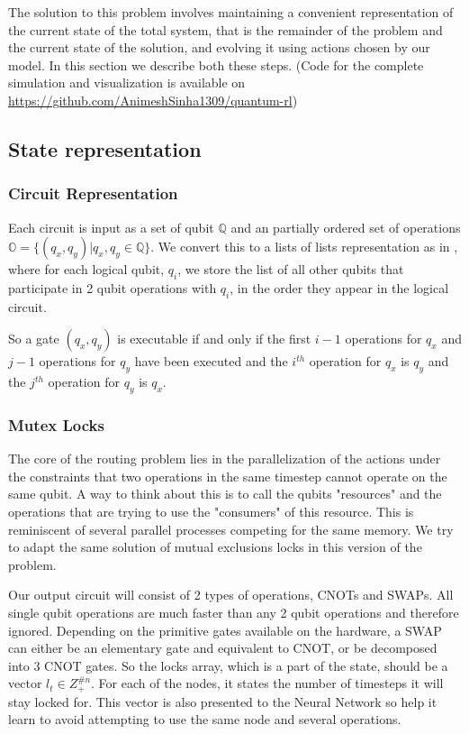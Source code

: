 \documentclass[%
 reprint,
 amsmath,amssymb,
 aps,
]{revtex4-2}
\begin{document}
The solution to this problem involves maintaining a convenient representation of the current state of the total system, that is the remainder of the problem and the current state of the solution, and evolving it using actions chosen by our model. In this section we describe both these steps. (Code for the complete simulation and visualization is available on \url{https://github.com/AnimeshSinha1309/quantum-rl})

\subsection{\label{sec:method-state}State representation}

\subsubsection{\label{sec:method-state-circuit}Circuit Representation}

Each circuit is input as a set of qubit $\mathbb{Q}$ and an partially ordered set of operations $\mathbb{O} = \{(q_x, q_y) \vert q_x, q_y \in \mathbb{Q}\}$.
We convert this to a lists of lists representation as in \citet{qroute_dqn2}, where for each logical qubit, $q_i$, we store the list of all other qubits that participate in 2 qubit operations with $q_i$, in the order they appear in the logical circuit.

\label{para:method-state-circuit-gatecond}So a gate $(q_x, q_y)$ is executable if and only if the first $i - 1$ operations for $q_x$ and $j - 1$ operations for $q_y$ have been executed and the $i^{th}$ operation for $q_x$ is $q_y$ and the $j^{th}$ operation for $q_y$ is $q_x$.

\subsubsection{\label{sec:method-state-mutex}Mutex Locks}

The core of the routing problem lies in the parallelization of the actions under the constraints that two operations in the same timestep cannot operate on the same qubit. A way to think about this is to call the qubits "resources" and the operations that are trying to use the "consumers" of this resource. This is reminiscent of several parallel processes competing for the same memory. We try to adapt the same solution of mutual exclusions locks \citep{mutex_dijkstra} in this version of the problem.

Our output circuit will consist of 2 types of operations, CNOTs and SWAPs. All single qubit operations are much faster than any 2 qubit operations and therefore ignored. Depending on the primitive gates available on the hardware, a SWAP can either be an elementary gate and equivalent to CNOT, or be decomposed into 3 CNOT gates. So the locks array, which is a part of the state, should be a vector $l_t \in Z_+^{\#n}$. For each of the nodes, it states the number of timesteps it will stay locked for. This vector is also presented to the Neural Network so help it learn to avoid attempting to use the same node and several operations.
\end{document}
